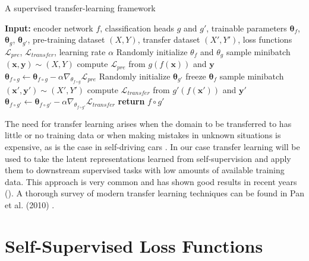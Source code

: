 \begin{algorithm}
    \caption{A supervised transfer-learning framework}
    \label{alg:transfer}
    
    \begin{algorithmic}[1]
        \State \textbf{Input:} encoder network $f$, classification heads $g$ and $g'$, trainable parameters  $\boldsymbol{\theta}_f$, $\boldsymbol{\theta}_g$, $\boldsymbol{\theta}_{g'}$, pre-training dataset $(X,Y)$, transfer dataset $(X', Y')$, loss functions $\mathcal{L}_{pre}$, $\mathcal{L}_{transfer}$, learning rate $\alpha$
        \State Randomly initialize $\theta_f$ and $\theta_g$ 
            \State sample minibatch $(\boldsymbol{x},\boldsymbol{y}) \sim (X,Y)$
            \State compute $\mathcal{L}_{pre}$ from $g(f(\boldsymbol{x}))$ and $\boldsymbol{y}$
            \State $\boldsymbol{\theta}_{f \circ g} \gets \boldsymbol{\theta}_{f \circ g} - \alpha \nabla_{\theta_{f \circ g}} \mathcal{L}_{pre}$ 
        \EndWhile
        \State Randomly initialize $\boldsymbol{\theta}_{g'}$ 
        \State freeze $\boldsymbol{\theta}_f$
            \State sample minibatch $(\boldsymbol{x'},\boldsymbol{y'}) \sim (X',Y')$
            \State compute $\mathcal{L}_{transfer}$ from $g'(f(\boldsymbol{x'}))$ and $\boldsymbol{y'}$
            \State $\boldsymbol{\theta}_{f \circ g'} \gets \boldsymbol{\theta}_{f \circ g'} - \alpha \nabla_{\theta_{f \circ g'}} \mathcal{L}_{transfer}$
        \EndWhile
        \State \textbf{return} $f \circ g'$
    \end{algorithmic}
\end{algorithm}

The need for transfer learning arises when the domain to be transferred to has little or no training data or when making mistakes in unknown situations is expensive, as is the case in self-driving cars \cite{fellicious2018transfer}. In our case transfer learning will be used to take the latent representations learned from self-supervision and apply them to downstream supervised tasks with low amounts of available training data. This approach is very common and has shown good results in recent years (\cite{dosovitskiy2015discriminative, oord2019representation, bachman2019learning}). A thorough survey of modern transfer learning techniques can be found in Pan et al. (2010) \cite{pan2010transfer}.

\section{Self-Supervised Loss Functions}\label{sec:ss_loss}

